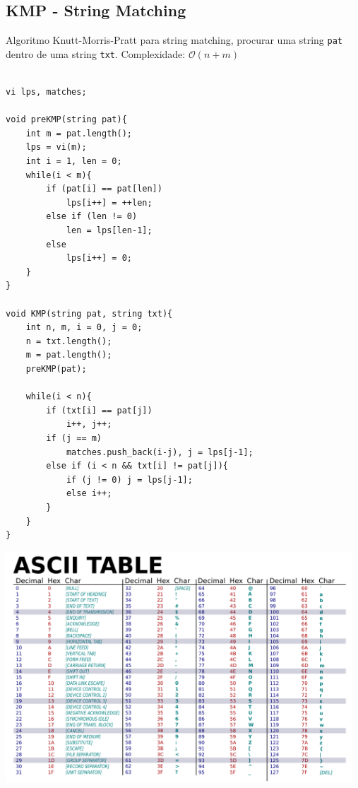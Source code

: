 \subsection{KMP - String Matching}
Algoritmo Knutt-Morris-Pratt para string matching, procurar uma string \lstinline{pat} dentro
de uma string \lstinline{txt}. Complexidade: $\mathcal{O}(n+m)$


\begin{verbatim}
    
vi lps, matches;

void preKMP(string pat){
    int m = pat.length();
    lps = vi(m);
    int i = 1, len = 0;
    while(i < m){
        if (pat[i] == pat[len])
            lps[i++] = ++len;
        else if (len != 0)
            len = lps[len-1];
        else
            lps[i++] = 0;
    }
}

void KMP(string pat, string txt){
    int n, m, i = 0, j = 0;
    n = txt.length();
    m = pat.length();
    preKMP(pat);
    
    while(i < n){
        if (txt[i] == pat[j])
            i++, j++;
        if (j == m)
            matches.push_back(i-j), j = lps[j-1];
        else if (i < n && txt[i] != pat[j]){
            if (j != 0) j = lps[j-1];
            else i++;
        }
    }
}

\end{verbatim}



\includegraphics[width=130mm]{6_strings/ASCII.png}
\pagebreak

